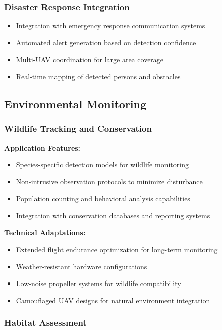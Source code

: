 \documentclass[12pt,a4paper]{article}
\begin{document}
\subsubsection{Disaster Response Integration}

\begin{itemize}
    \item Integration with emergency response communication systems
    \item Automated alert generation based on detection confidence
    \item Multi-UAV coordination for large area coverage
    \item Real-time mapping of detected persons and obstacles
\end{itemize}

\subsection{Environmental Monitoring}

\subsubsection{Wildlife Tracking and Conservation}

\textbf{Application Features:}
\begin{itemize}
    \item Species-specific detection models for wildlife monitoring
    \item Non-intrusive observation protocols to minimize disturbance
    \item Population counting and behavioral analysis capabilities
    \item Integration with conservation databases and reporting systems
\end{itemize}

\textbf{Technical Adaptations:}
\begin{itemize}
    \item Extended flight endurance optimization for long-term monitoring
    \item Weather-resistant hardware configurations
    \item Low-noise propeller systems for wildlife compatibility
    \item Camouflaged UAV designs for natural environment integration
\end{itemize}

\subsubsection{Habitat Assessment}
\end{document}
